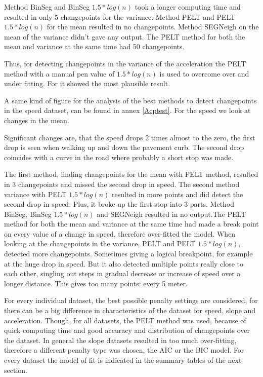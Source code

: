 Method BinSeg and BinSeg $1.5*log(n)$ took a longer computing time and resulted in only 5 changepoints for the variance. Method PELT and PELT $1.5*log(n)$ for the mean resulted in no changepoints. Method SEGNeigh on the mean of the variance didn't gave any output. The PELT method for both the mean and variance at the same time had 50 changepoints. 


Thus, for detecting changepoints in the variance of the acceleration the PELT method with a manual pen value of $1.5 * log(n)$ is used to overcome over and under fitting. For it showed the most plausible result.

A same kind of figure for the analysis of the best methods to detect changepoints in the speed dataset, can be found in annex \ref{Acptest}.
For the speed we look at changes in the mean.

Significant changes are, that the speed drops 2 times almost to the zero, the first drop is seen when walking up and down the pavement curb. The second drop coincides with a curve in the road where probably a short stop was made.

The first method, finding changepoints for the mean with PELT method, resulted in 3 changepoints and missed the second drop in speed. The second method variance with PELT $1.5*log(n)$ resulted in more points and did detect the second drop in speed. Plus, it broke up the first stop into 3 parts. Method BinSeg, BinSeg $1.5*log(n)$ and SEGNeigh resulted in no output.The PELT method for both the mean and variance at the same time had made a break point on every value of a change in speed, therefore over-fitted the model. 
When looking at the changepoints in the variance, PELT and PELT $1.5*log(n)$, detected more changepoints. Sometimes giving a logical breakpoint, for example at the huge drop in speed. But it also detected multiple points really close to each other, singling out steps in gradual decrease or increase of speed over a longer distance. This gives too many points: every 5 meter. 


For every individual dataset, the best possible penalty settings are considered, for there can be a big difference in characteristics of the dataset for speed, slope and acceleration. Though, for all datasets, the PELT method was used, because of quick computing time and good accuracy and distribution of changepoints over the dataset. In general the slope datasets resulted in too much over-fitting, therefore a different penalty type was chosen, the AIC or the BIC model. For every dataset the model of fit is indicated in the summary tables of the next section. 





